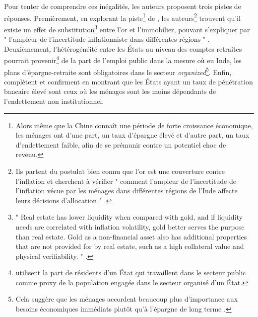 \documentclass[a4paper, 11pt, onecolumn]{article}
\begin{document}
 Pour tenter de comprendre ces inégalités, les auteurs proposent trois pistes de réponses.
 Premièrement, en explorant la piste\footnote{Alors même que la Chine connaît une période de forte croissance économique, les ménages ont d'une part, un taux d'épargne élevé et d'autre part, un taux d'endettement faible, afin de se prémunir contre un potentiel choc de revenu.} de \cite{Chamon2010}, les auteurs\footnote{Ils partent du postulat bien connu que l'or est une couverture contre l'inflation et cherchent à vérifier " comment l'ampleur de l'incertitude de l'inflation vécue par les ménages dans différentes régions de l'Inde affecte leurs décisions d'allocation " \citep{Badarinza2016b}.} trouvent qu'il existe un effet de substitution\footnote{" Real estate has lower liquidity when compared with gold, and if liquidity needs are correlated with inflation volatility, gold better serves the purpose than real estate. Gold as a non-financial asset also has additional properties that are not provided for by real estate, such as a high collateral value and physical verifiability. " \citep{Badarinza2016b}.} entre l'or et l'immobilier, pouvant s'expliquer par " l'ampleur de l'incertitude inflationniste dans différentes régions " \citep{Badarinza2016b}.
 Deuxièmement, l'hétérogénéité entre les États au niveau des comptes retraites pourrait provenir\footnote{\cite{Badarinza2016b} utilisent la part de résidents d'un État qui travaillent dans le secteur public comme proxy de la population engagée dans le secteur organisé d'un État.} de la part de l'emploi public dans la mesure où en Inde, les plans d'épargne-retraite sont obligatoires dans le secteur \textit{organized}\footnote{Cela suggère que les ménages accordent beaucoup plus d'importance aux besoins économiques immédiats plutôt qu'à l'épargne de long terme \citep{Badarinza2016b}.}.
 Enfin, \cite{Badarinza2016b} complètent et confirment \cite{Burgess2005} en montrant que les États ayant un taux de pénétration bancaire élevé sont ceux où les ménages sont les moins dépendants de l'endettement non institutionnel.

\end{document}
